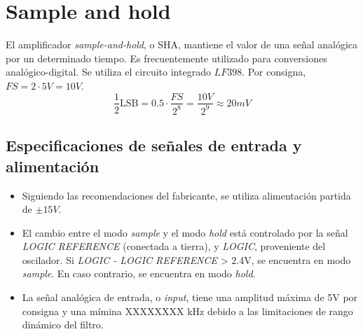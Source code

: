 \documentclass[../../ASSD_TP1_G7.tex]{subfiles}
\begin{document}
\chapter*{Sample and hold}
El amplificador \textit{sample-and-hold}, o SHA, mantiene el valor de una se\~nal anal\'ogica por un determinado tiempo. Es frecuentemente utilizado para conversiones anal\'ogico-digital. Se utiliza el circuito integrado $LF398$. Por consigna, $FS = 2\cdot 5V = 10V$.
\[\frac{1}{2}\text{LSB} = 0.5\cdot \frac{FS}{2^8} = \frac{10V}{2^9} \approx 20mV\]


\section{Especificaciones de se\~nales de entrada y alimentaci\'on}
\begin{itemize}
	\item Siguiendo las recomendaciones del fabricante, se utiliza alimentaci\'on partida de $\pm 15V$.
	\item El cambio entre el modo \textit{sample} y el modo \textit{hold} est\'a controlado por la se\~nal \textit{LOGIC REFERENCE} (conectada a tierra), y \textit{LOGIC}, proveniente del oscilador.  Si \textit{LOGIC - LOGIC REFERENCE} > 2.4V, se encuentra en modo \textit{sample}. En caso contrario, se encuentra en modo \textit{hold}.
	\item La se\~nal anal\'ogica de entrada, o \textit{input}, tiene una amplitud m\'axima de 5V por consigna y una m\'imina XXXXXXXX kHz debido a las limitaciones de rango din\'amico del filtro. 
\end{itemize}
\end{document}
